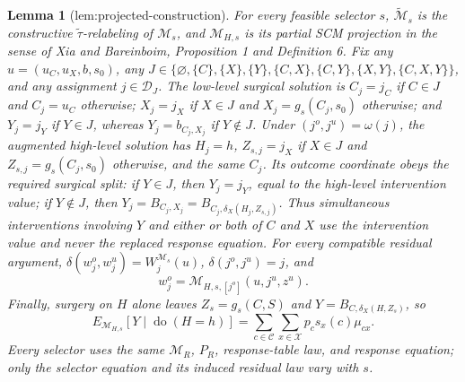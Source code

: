 \documentclass{article}
\newtheorem{lemma}{Lemma}
\begin{document}
\begin{lemma}[lem:projected-construction]\label{lem:projected-construction}
For every feasible selector \(s\), \(\widetilde{\mathcal M}_s\) is the constructive \(\widetilde\tau\)-relabeling of \(\mathcal M_s\), and \(\mathcal M_{H,s}\) is its partial SCM projection in the sense of Xia and Bareinboim, Proposition 1 and Definition 6. Fix any \(u=(u_C,u_X,b,s_0)\), any \(J\in\{\varnothing,\{C\},\{X\},\{Y\},\{C,X\},\{C,Y\},\{X,Y\},\{C,X,Y\}\}\), and any assignment \(j\in\mathcal D_J\). The low-level surgical solution is \(C_j=j_C\) if \(C\in J\) and \(C_j=u_C\) otherwise; \(X_j=j_X\) if \(X\in J\) and \(X_j=g_s(C_j,s_0)\) otherwise; and \(Y_j=j_Y\) if \(Y\in J\), whereas \(Y_j=b_{C_j,X_j}\) if \(Y\notin J\). Under \((j^o,j^u)=\omega(j)\), the augmented high-level solution has \(H_j=h\), \(Z_{s,j}=j_X\) if \(X\in J\) and \(Z_{s,j}=g_s(C_j,s_0)\) otherwise, and the same \(C_j\). Its outcome coordinate obeys the required surgical split: if \(Y\in J\), then \(Y_j=j_Y\), equal to the high-level intervention value; if \(Y\notin J\), then \(Y_j=B_{C_j,X_j}=B_{C_j,\delta_X(H_j,Z_{s,j})}\). Thus simultaneous interventions involving \(Y\) and either or both of \(C\) and \(X\) use the intervention value and never the replaced response equation. For every compatible residual argument, \(\delta(w_j^o,w_j^u)=W_j^{\mathcal M_s}(u)\), \(\delta(j^o,j^u)=j\), and \[w_j^o=\mathcal M_{H,s,[j^o]}(u,j^u,z^u).\] Finally, surgery on \(H\) alone leaves \(Z_s=g_s(C,S)\) and \(Y=B_{C,\delta_X(H,Z_s)}\), so \[E_{\mathcal M_{H,s}}[Y\mid\operatorname{do}(H=h)]=\sum_{c\in\mathcal C}\sum_{x\in\mathcal X}p_cs_x(c)\mu_{cx}.\] Every selector uses the same \(\mathcal M_R\), \(P_R\), response-table law, and response equation; only the selector equation and its induced residual law vary with \(s\).
\end{lemma}
\end{document}
